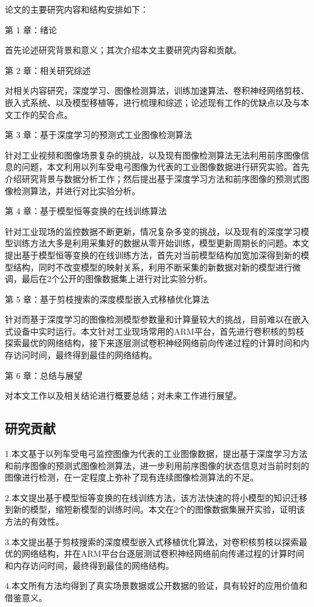 论文的主要研究内容和结构安排如下：

第 1 章：绪论
	
首先论述研究背景和意义；其次介绍本文主要研究内容和贡献。

第 2 章：相关研究综述

对相关内容研究，深度学习、图像检测算法，训练加速算法、卷积神经网络剪枝、嵌入式系统、以及模型移植等，进行梳理和综述；论述现有工作的优缺点以及与本文工作的契合点。

第 3 章：基于深度学习的预测式工业图像检测算法

针对工业视频和图像场景复杂的挑战，以及现有图像检测算法无法利用前序图像信息的问题，本文利用以列车受电弓图像为代表的工业图像数据进行研究实验。首先介绍研究背景与数据分析工作；然后提出基于深度学习方法和前序图像的预测式图像检测算法，并进行对比实验分析。

第 4 章：基于模型恒等变换的在线训练算法

针对工业现场的监控数据不断更新，情况复杂多变的挑战，以及现有的深度学习模型训练方法大多是利用采集好的数据从零开始训练，模型更新周期长的问题。本文提出基于模型恒等变换的在线训练方法，首先对当前模型结构加宽加深得到新的模型结构，同时不改变模型的映射关系，利用不断采集的新数据对新的模型进行微调，最后在2个公开的图像数据集上进行对比实验分析。

第 5 章：基于剪枝搜索的深度模型嵌入式移植优化算法

针对而基于深度学习的图像检测模型参数量和计算量较大的挑战，目前难以在嵌入式设备中实时运行。本文针对工业现场常用的ARM平台，首先进行卷积核的剪枝探索最优的网络结构，接下来逐层测试卷积神经网络前向传递过程的计算时间和内存访问时间，最终得到最佳的网络结构。

第 6 章：总结与展望

对本文工作以及相关结论进行概要总结；对未来工作进行展望。

\subsection{研究贡献}

1.本文基于以列车受电弓监控图像为代表的工业图像数据，提出基于深度学习方法和前序图像的预测式图像检测算法，进一步利用前序图像的状态信息对当前时刻的图像进行检测，在一定程度上弥补了现有连续图像检测算法的不足。

2.本文提出基于模型恒等变换的在线训练方法，该方法快速的将小模型的知识迁移到新的模型，缩短新模型的训练时间。本文在2个的图像数据集展开实验，证明该方法的有效性。

3.本文提出基于剪枝搜索的深度模型嵌入式移植优化算法，对卷积核剪枝以探索最优的网络结构，并在ARM平台台逐层测试卷积神经网络前向传递过程的计算时间和内存访问时间，最终得到最佳的网络结构。

4.本文所有方法均得到了真实场景数据或公开数据的验证，具有较好的应用价值和借鉴意义。



